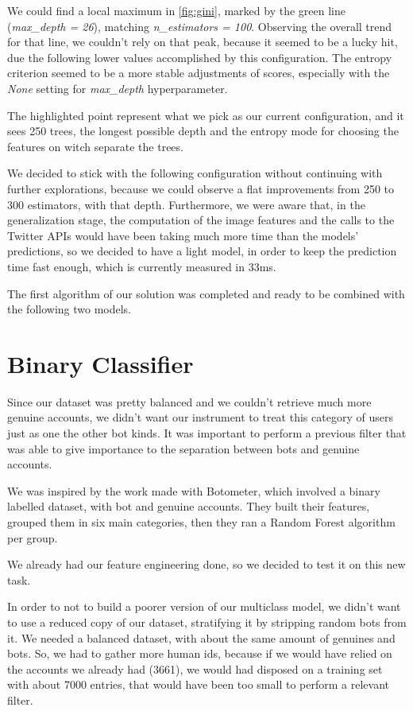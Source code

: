 We could find a local maximum in \ref{fig:gini}, marked by the green line (\textit{max\_depth = 26}), matching \textit{n\_estimators = 100}. Observing the overall trend for that line, we couldn't rely on that peak, because it seemed to be a lucky hit, due the following lower values accomplished by this configuration. The entropy criterion seemed to be a more stable adjustments of scores, especially with the \textit{None} setting for \textit{max\_depth} hyperparameter.

The highlighted point represent what we pick as our current configuration, and it sees 250 trees, the longest possible depth and the entropy mode for choosing the features on witch separate the trees. 

We decided to stick with the following configuration without continuing with further explorations, because we could observe a flat improvements from 250 to 300 estimators, with that depth.
Furthermore, we were aware that, in the generalization stage, the computation of the image features and the calls to the Twitter APIs would have been taking much more time than the models' predictions, so we decided to have a light model, in order to keep the prediction time fast enough, which is currently measured in 33ms. 

The first algorithm of our solution was completed and ready to be combined with the following two models.

\section{Binary Classifier}
Since our dataset was pretty balanced and we couldn't retrieve much more genuine accounts, we didn't want our instrument to treat this category of users just as one the other bot kinds. It was important to perform a previous filter that was able to give importance to the separation between bots and genuine accounts.

We was inspired by the work made with Botometer\cite{Botometer}, which involved a binary labelled dataset, with bot and genuine accounts.
They built their features, grouped them in six main categories, then they ran a Random Forest algorithm per group.

We already had our feature engineering done, so we decided to test it on this new task.

In order to not to build a poorer version of our multiclass model, we didn't want to use a reduced copy of our dataset, stratifying it by stripping random bots from it. We needed a balanced dataset, with about the same amount of genuines and bots. So, we had to gather more human ids, because if we would have relied on the accounts we already had (3661), we would had disposed on a training set with about 7000 entries, that would have been too small to perform a relevant filter.
